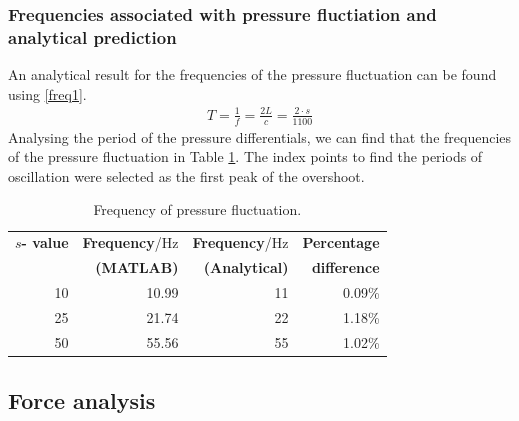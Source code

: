 \subsubsection{Frequencies associated with pressure fluctiation and analytical prediction}
An analytical result for the frequencies of the pressure fluctuation can be found using \eqref{freq1}.
\begin{gather}\label{freq1}
    T = \frac{1}{f} = \frac{2L}{c} = \frac{2\cdot s}{1100}
\end{gather}
Analysing the period of the pressure differentials, we can  find that the frequencies of the pressure fluctuation in Table \ref{freq2}. The index points to find the periods of oscillation were selected as the first peak of the overshoot.
\begin{table}[H]
    \centering
    \begin{tabular}{@{}rrrr@{}}
        \toprule
        \textbf{$s$- value} & \textbf{Frequency}/\si{\hertz} & \textbf{Frequency}/\si{\hertz} & \textbf{Percentage}\\
        & \textbf{(MATLAB)} & \textbf{(Analytical)} & \textbf{difference}\\
        \midrule
        10 & 10.99 & 11 & 0.09\%\\
        25 & 21.74 & 22 & 1.18\%\\
        50 & 55.56 & 55 & 1.02\%\\
        \bottomrule
    \end{tabular}
    \caption{Frequency of pressure fluctuation.}
    \label{freq2}
\end{table}
\subsection{Force analysis}
